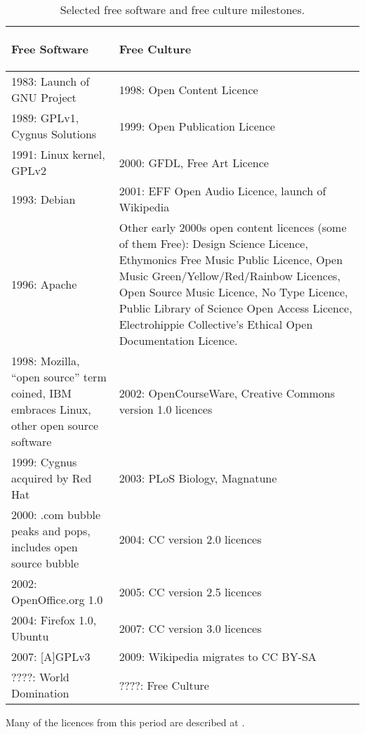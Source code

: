 \begin{table}[h]
\label{t:free_culture_software_freedom:relative_progress:milestones}
\begin{tabular}{|p{7cm}|p{7cm}|}

\hline
\begin{center}\textbf{Free Software}\end{center} & \begin{center}\textbf{Free Culture}\end{center}\\
\hline

1983: Launch of GNU Project & 1998: Open Content Licence\\
1989: GPLv1, Cygnus Solutions & 1999: Open Publication Licence\\
1991: Linux kernel, GPLv2 & 2000: GFDL, Free Art Licence\\
1993: Debian & 2001: EFF Open Audio Licence, launch of Wikipedia\\
1996: Apache & Other early 2000s open content licences (some of them Free):
Design Science Licence, Ethymonics Free Music Public Licence, Open Music
Green/Yellow/Red/Rainbow Licences, Open Source Music Licence, No Type Licence,
Public Library of Science Open Access Licence, Electrohippie Collective's
Ethical Open Documentation Licence.\\
1998: Mozilla, ``open source'' term coined, IBM embraces Linux, other open source
software & 2002: OpenCourseWare, Creative Commons version 1.0 licences\\
1999: Cygnus acquired by Red Hat & 2003: PLoS Biology, Magnatune\\
2000: .com bubble peaks and pops, includes open source bubble & 2004: CC version 2.0 licences\\
2002: OpenOf\hbox{}f\hbox{}ice.org 1.0 & 2005: CC version 2.5 licences\\
2004: F\hbox{}irefox 1.0, Ubuntu & 2007: CC version 3.0 licences\\
2007: [A]GPLv3 & 2009: Wikipedia migrates to CC BY-SA\\
????: World Domination & ????: Free Culture\\

\hline
\end{tabular}
\caption{Selected free software and free culture milestones.}
\end{table}

Many of the licences from this period are described at \cite{culture-licenses}.


